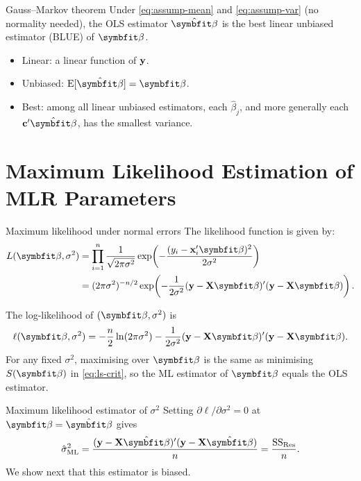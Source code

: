 \begin{frame}{Gauss--Markov theorem}
    Under \eqref{eq:assump-mean} and \eqref{eq:assump-var} (no normality needed), the OLS estimator $\hat{\bbeta}$ is the best linear unbiased estimator (BLUE) of $\bbeta$.
    \begin{itemize}
        \item Linear: a linear function of $\mathbf{y}$.
        \item Unbiased: $\E[\hat{\bbeta}]=\bbeta$.
        \item Best: among all linear unbiased estimators, each $\hat\beta_j$, and more generally each $\mathbf{c}'\hat{\bbeta}$, has the smallest variance.
    \end{itemize}
\end{frame}


\section{Maximum Likelihood Estimation of MLR Parameters}


\begin{frame}{Maximum likelihood under normal errors}
    The likelihood function is given by:
    \begin{align*}
        L(\bbeta,\sigma^2) &= \prod_{i=1}^{n} \frac{1}{\sqrt{2\pi\sigma^2}} \exp\!\left(-\frac{(y_i-\bx_i'\bbeta)^2}{2\sigma^2}\right) \\
        &= (2\pi\sigma^2)^{-n/2} \exp\!\left(-\frac{1}{2\sigma^2}(\by-\bX\bbeta)'(\by-\bX\bbeta)\right).
    \end{align*}

    The log-likelihood of $(\bbeta,\sigma^2)$ is
    \begin{align}
        \ell(\bbeta,\sigma^2) = -\frac n2\ln(2\pi\sigma^2) - \frac{1}{2\sigma^2}(\by-\bX\bbeta)'(\by-\bX\bbeta). \label{eq:loglik}
    \end{align}
    For any fixed $\sigma^2$, maximising over $\bbeta$ is the same as minimising $S(\bbeta)$ in \eqref{eq:ls-crit}, so the ML estimator of $\bbeta$ equals the OLS estimator.
\end{frame}


\begin{frame}{Maximum likelihood estimator of $\sigma^2$}
    Setting $\partial\ell/\partial\sigma^2=0$ at $\bbeta=\hat{\bbeta}$ gives
    \begin{align}
        \hat\sigma^2_{\ML} = \frac{(\by-\bX\hat{\bbeta})'(\by-\bX\hat{\bbeta})}{n} = \frac{\SSRes}{n}. \label{eq:mle-s2}
    \end{align}
    We show next that this estimator is biased.
\end{frame}


